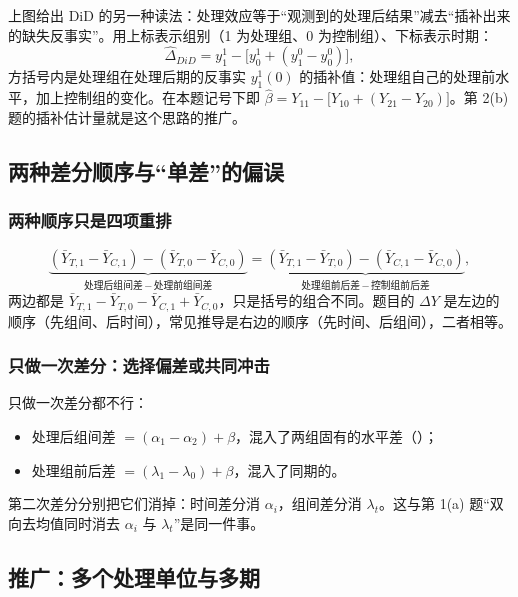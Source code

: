 上图给出 DiD 的另一种读法：处理效应等于“观测到的处理后结果”减去“插补出来的缺失反事实”。用上标表示组别（1 为处理组、0 为控制组）、下标表示时期：
\[
\hat\Delta_{DiD}=y^1_1-\bigl[y^1_0+(y^0_1-y^0_0)\bigr],
\]
方括号内是处理组在处理后期的反事实 $y^1_1(0)$ 的插补值：处理组自己的处理前水平，加上控制组的变化。在本题记号下即 $\hat\beta=Y_{11}-\bigl[Y_{10}+(Y_{21}-Y_{20})\bigr]$。第 2(b) 题的插补估计量就是这个思路的推广。

\subsection{两种差分顺序与“单差”的偏误}

\subsubsection{两种顺序只是四项重排}

\[
\underbrace{(\bar Y_{T,1}-\bar Y_{C,1})-(\bar Y_{T,0}-\bar Y_{C,0})}_{\text{处理后组间差}\,-\,\text{处理前组间差}}
=\underbrace{(\bar Y_{T,1}-\bar Y_{T,0})-(\bar Y_{C,1}-\bar Y_{C,0})}_{\text{处理组前后差}\,-\,\text{控制组前后差}},
\]
两边都是 $\bar Y_{T,1}-\bar Y_{T,0}-\bar Y_{C,1}+\bar Y_{C,0}$，只是括号的组合不同。题目的 $\Delta Y$ 是左边的顺序（先组间、后时间），常见推导是右边的顺序（先时间、后组间），二者相等。

\subsubsection{只做一次差分：选择偏差或共同冲击}

只做一次差分都不行：
\begin{itemize}
  \item 处理后组间差 $=(\alpha_1-\alpha_2)+\beta$，混入了两组固有的水平差（）；
  \item 处理组前后差 $=(\lambda_1-\lambda_0)+\beta$，混入了同期的。
\end{itemize}
第二次差分分别把它们消掉：时间差分消 $\alpha_i$，组间差分消 $\lambda_t$。这与第 1(a) 题“双向去均值同时消去 $\alpha_i$ 与 $\lambda_t$”是同一件事。

\subsection{推广：多个处理单位与多期}\label{sec:U17b-general}

